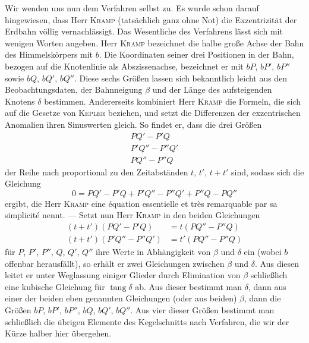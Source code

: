 Wir wenden uns nun dem Verfahren selbst zu. Es wurde schon darauf hingewiesen, dass Herr \textsc{Kramp} (tatsächlich ganz ohne Not) die Exzentrizität der Erdbahn völlig vernachlässigt. Das Wesentliche des Verfahrens lässt sich mit wenigen Worten angeben. Herr \textsc{Kramp} bezeichnet die halbe große Achse der Bahn des Himmelskörpers mit $b$. Die Koordinaten seiner drei Positionen in der Bahn, bezogen auf die Knotenlinie als Abszissenachse, bezeichnet er mit $bP$, $bP'$, $bP''$ sowie $bQ$, $bQ'$, $bQ''$. Diese sechs Größen lassen sich bekanntlich leicht aus den Beobachtungsdaten, der Bahnneigung $\beta$ und der Länge des aufsteigenden Knotens $\delta$ bestimmen. Andererseits kombiniert Herr \textsc{Kramp} die Formeln, die sich auf die Gesetze von \textsc{Kepler} beziehen, und setzt die Differenzen der exzentrischen Anomalien ihren Sinuswerten gleich. So findet er, dass die drei Größen
\[
\begin{gathered}
PQ' - P'Q\\
P'Q'' - P''Q'\\
PQ'' - P''Q
\end{gathered}
\]
der Reihe nach proportional zu den Zeitabständen $t$, $t'$, $t+t'$ sind, sodass sich die Gleichung
\[
0 = PQ' - P'Q + P'Q'' - P''Q' + P''Q - PQ''
\]
ergibt, die Herr \textsc{Kramp} eine équation essentielle et très remarquable par sa simplicité nennt. --- Setzt nun Herr \textsc{Kramp} in den beiden Gleichungen
\[
\begin{aligned}
(t+t')(PQ'-P'Q) &= t(PQ''-P''Q)\\
(t+t')(P'Q''-P''Q') &= t'(PQ''-P''Q)
\end{aligned}
\]
für $P$, $P'$, $P''$, $Q$, $Q'$, $Q''$ ihre Werte in Abhängigkeit von $\beta$ und $\delta$ ein (wobei $b$ offenbar herausfällt), so erhält er zwei Gleichungen zwischen $\beta$ und $\delta$. Aus diesen leitet er unter Weglassung einiger Glieder durch Elimination von $\beta$ schließlich eine kubische Gleichung für $\operatorname{tang}\delta$ ab. Aus dieser bestimmt man $\delta$, dann aus einer der beiden eben genannten Gleichungen (oder aus beiden) $\beta$, dann die Größen $bP$, $bP'$, $bP''$, $bQ$, $bQ'$, $bQ''$. Aus vier dieser Größen bestimmt man schließlich die übrigen Elemente des Kegelschnitts nach Verfahren, die wir der Kürze halber hier übergehen.

